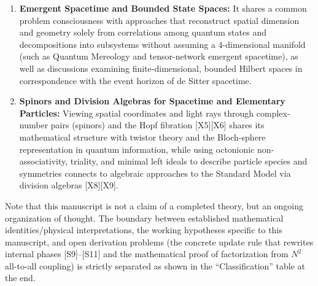 \documentclass[
  a4paper,
]{article}
\providecommand{\tightlist}{%
  \setlength{\itemsep}{0pt}\setlength{\parskip}{0pt}}
\begin{document}
\begin{enumerate}
\def\labelenumi{\arabic{enumi}.}
\tightlist
\item
  \textbf{Emergent Spacetime and Bounded State Spaces:} It shares a
  common problem consciousness with approaches that reconstruct spatial
  dimension and geometry solely from correlations among quantum states
  and decompositions into subsystems without assuming a 4-dimensional
  manifold (such as Quantum Mereology and tensor-network emergent
  spacetime), as well as discussions examining finite-dimensional,
  bounded Hilbert spaces in correspondence with the event horizon of de
  Sitter spacetime.
\item
  \textbf{Spinors and Division Algebras for Spacetime and Elementary
  Particles:} Viewing spatial coordinates and light rays through
  complex-number pairs (spinors) and the Hopf fibration {[}X5{]}{[}X6{]}
  shares its mathematical structure with twistor theory and the
  Bloch-sphere representation in quantum information, while using
  octonionic non-associativity, triality, and minimal left ideals to
  describe particle species and symmetries connects to algebraic
  approaches to the Standard Model via division algebras
  {[}X8{]}{[}X9{]}.
\end{enumerate}

Note that this manuscript is not a claim of a completed theory, but an
ongoing organization of thought. The boundary between established
mathematical identities/physical interpretations, the working hypotheses
specific to this manuscript, and open derivation problems (the concrete
update rule that rewrites internal phases {[}S9{]}--{[}S11{]} and the
mathematical proof of factorization from \(N^2\) all-to-all coupling) is
strictly separated as shown in the ``Classification'' table at the end.
\end{document}
